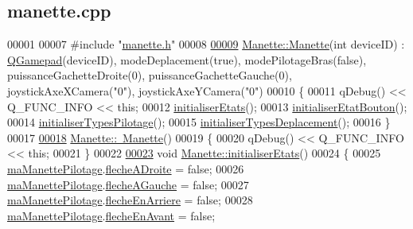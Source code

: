 \hypertarget{manette_8cpp_source}{}\subsection{manette.\+cpp}
\label{manette_8cpp_source}

\begin{DoxyCode}
00001 
00007 \textcolor{preprocessor}{#include "\hyperlink{manette_8h}{manette.h}"}
00008 
\hyperlink{class_manette_aaeb630a14bd4905666146dca3253827b}{00009} \hyperlink{class_manette_aaeb630a14bd4905666146dca3253827b}{Manette::Manette}(\textcolor{keywordtype}{int} deviceID) : \hyperlink{class_q_gamepad}{QGamepad}(deviceID), modeDeplacement(true), 
      modePilotageBras(false), puissanceGachetteDroite(0), puissanceGachetteGauche(0), joystickAxeXCamera(\textcolor{stringliteral}{"0"}), 
      joystickAxeYCamera(\textcolor{stringliteral}{"0"})
00010 \{
00011     qDebug() << Q\_FUNC\_INFO << \textcolor{keyword}{this};
00012     \hyperlink{class_manette_afd722561b4cc62304e81a8e41c820bb8}{initialiserEtats}();
00013     \hyperlink{class_manette_a21ebb19837250342e4859ba7dc5f03cc}{initialiserEtatBouton}();
00014     \hyperlink{class_manette_ab20afdb190b24126e54d4f80af0bf310}{initialiserTypesPilotage}();
00015     \hyperlink{class_manette_a9888b04a784ceda912a35b6eb30ae84a}{initialiserTypesDeplacement}();
00016 \}
00017 
\hyperlink{class_manette_a86a0cab49599b27d86c2e77f13fa54a2}{00018} \hyperlink{class_manette_a86a0cab49599b27d86c2e77f13fa54a2}{Manette::~Manette}()
00019 \{
00020     qDebug() << Q\_FUNC\_INFO << \textcolor{keyword}{this};
00021 \}
00022 
\hyperlink{class_manette_afd722561b4cc62304e81a8e41c820bb8}{00023} \textcolor{keywordtype}{void} \hyperlink{class_manette_afd722561b4cc62304e81a8e41c820bb8}{Manette::initialiserEtats}()
00024 \{
00025     \hyperlink{class_manette_aeb3e02eaeaec4c656f78ed8fc6dae342}{maManettePilotage}.\hyperlink{struct_etat_manette_pilotage_a78a791f6f8968042efd8e2f64f70f882}{flecheADroite} = \textcolor{keyword}{false};
00026     \hyperlink{class_manette_aeb3e02eaeaec4c656f78ed8fc6dae342}{maManettePilotage}.\hyperlink{struct_etat_manette_pilotage_aace02b9bb3feb3b618dd9133d4c5b87f}{flecheAGauche} = \textcolor{keyword}{false};
00027     \hyperlink{class_manette_aeb3e02eaeaec4c656f78ed8fc6dae342}{maManettePilotage}.\hyperlink{struct_etat_manette_pilotage_ab7cce4480358d2e7ac189e96ab04b894}{flecheEnArriere} = \textcolor{keyword}{false};
00028     \hyperlink{class_manette_aeb3e02eaeaec4c656f78ed8fc6dae342}{maManettePilotage}.\hyperlink{struct_etat_manette_pilotage_a12429b457b51cb45cc9d405f3a01bea6}{flecheEnAvant} = \textcolor{keyword}{false};

\end{DoxyCode}
